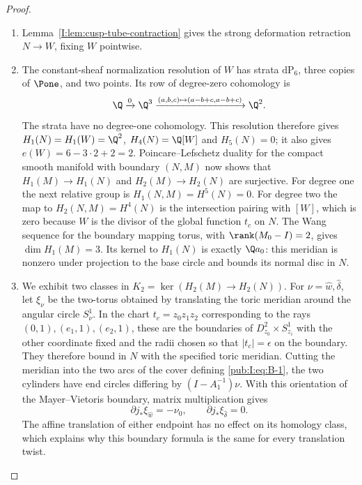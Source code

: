 \begin{proof}
\begin{enumerate}[label=\arabic*.,leftmargin=*]
\item Lemma~\ref{I:lem:cusp-tube-contraction} gives the strong
deformation retraction $N\to W$, fixing $W$ pointwise.

\item The constant-sheaf normalization resolution of $W$ has strata
$\mathrm{dP}_6$, three copies of $\Pone$, and two points.
Its row of degree-zero cohomology is
\[
 \Q\xrightarrow{0}\Q^3
 \xrightarrow{(a,b,c)\mapsto(a-b+c,a-b+c)}\Q^2.
\]
The strata have no degree-one cohomology. This resolution therefore
gives $H_1(N)=H_1(W)=\Q^2$, $H_4(N)=\Q[W]$ and $H_5(N)=0$;
it also gives $e(W)=6-3\cdot2+2=2$.
Poincare--Lefschetz duality for the compact smooth manifold with
boundary $(N,M)$ now shows that $H_1(M)\to H_1(N)$ and
$H_2(M)\to H_2(N)$ are surjective. For degree one the next
relative group is $H_1(N,M)=H^5(N)=0$.
For degree two the map to $H_2(N,M)=H^4(N)$ is the intersection
pairing with $[W]$, which is zero because $W$ is the divisor of
the global function $t_c$ on $N$. The Wang sequence for the
boundary mapping torus, with $\rank(M_0-I)=2$, gives
$\dim H_1(M)=3$. Its kernel to $H_1(N)$ is exactly
$\Q a_0$: this meridian is nonzero under projection to the base
circle and bounds its normal disc in $N$.

\item We exhibit two classes in
$K_2=\ker(H_2(M)\to H_2(N))$.
For $\nu=\hat w,\hat\delta$, let $\xi_\nu$ be the two-torus
obtained by translating the toric meridian around the angular
circle $S^1_\nu$. In the chart $t_c=z_0z_1z_2$ corresponding to
the rays $(0,1),(e_1,1),(e_2,1)$, these are the boundaries of
$D^2_{z_0}\times S^1_{z_i}$ with the other coordinate fixed
and the radii chosen so that $|t_c|=\epsilon$ on the boundary.
They therefore bound in $N$ with the specified toric meridian.
Cutting the meridian into the two arcs of the cover defining
\eqref{pub:I:eq:B-1}, the two cylinders have end circles differing by
$(I-A_1^{-1})\nu$. With this orientation of the Mayer--Vietoris
boundary, matrix multiplication gives
\begin{equation}
 \partial j_*\xi_{\hat w}=-\nu_0,\qquad
 \partial j_*\xi_{\hat\delta}=0.
\label{pub:I:eq:B-3}
\end{equation}
The affine translation of either endpoint has no effect on its
homology class, which explains why this boundary formula is the
same for every translation twist.


\end{enumerate}
\end{proof}
